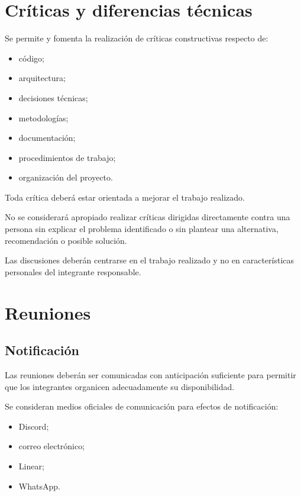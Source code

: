 \documentclass[12pt,a4paper]{article}
\begin{document}
\section{Críticas y diferencias técnicas}

Se permite y fomenta la realización de críticas constructivas respecto de:

\begin{itemize}
    \item código;
    \item arquitectura;
    \item decisiones técnicas;
    \item metodologías;
    \item documentación;
    \item procedimientos de trabajo;
    \item organización del proyecto.
\end{itemize}

Toda crítica deberá estar orientada a mejorar el trabajo realizado.

No se considerará apropiado realizar críticas dirigidas directamente contra una persona sin explicar el problema identificado o sin plantear una alternativa, recomendación o posible solución.

Las discusiones deberán centrarse en el trabajo realizado y no en características personales del integrante responsable.

\section{Reuniones}

\subsection{Notificación}

Las reuniones deberán ser comunicadas con anticipación suficiente para permitir que los integrantes organicen adecuadamente su disponibilidad.

Se consideran medios oficiales de comunicación para efectos de notificación:

\begin{itemize}
    \item Discord;
    \item correo electrónico;
    \item Linear;
    \item WhatsApp.
\end{itemize}
\end{document}
